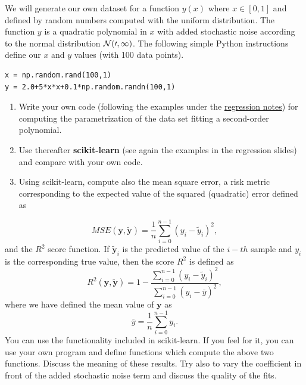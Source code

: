 \documentclass{beamer}
\newenvironment{doconceexercise}{}{}
\newcounter{doconceexercisecounter}
\newcounter{doconce:movie:counter}
\begin{document}
\begin{frame}
\begin{doconceexercise}
                             

We will generate our own dataset for a function $y(x)$ where $x \in [0,1]$ and defined by random numbers computed with the uniform distribution. The function $y$ is a quadratic polynomial in $x$ with added stochastic noise according to the normal distribution $\cal {N}(0,1)$.
The following simple Python instructions define our $x$ and $y$ values (with 100 data points).



\begin{verbatim}
x = np.random.rand(100,1)
y = 2.0+5*x*x+0.1*np.random.randn(100,1)

\end{verbatim}


\begin{enumerate}
\item Write your own code (following the examples under the \href{{https://compphysics.github.io/MachineLearning/doc/LectureNotes/_build/html/chapter1.html}}{regression notes}) for computing the parametrization of the data set fitting a second-order polynomial. 

\item Use thereafter \textbf{scikit-learn} (see again the examples in the regression slides) and compare with your own code.   

\item Using scikit-learn, compute also the mean square error, a risk metric corresponding to the expected value of the squared (quadratic) error defined as
\end{enumerate}

\noindent
\[ MSE(\bm{y},\bm{\tilde{y}}) = \frac{1}{n}
\sum_{i=0}^{n-1}(y_i-\tilde{y}_i)^2, 
\] 
and the $R^2$ score function.
If $\tilde{\bm{y}}_i$ is the predicted value of the $i-th$ sample and $y_i$ is the corresponding true value, then the score $R^2$ is defined as
\[
R^2(\bm{y}, \tilde{\bm{y}}) = 1 - \frac{\sum_{i=0}^{n - 1} (y_i - \tilde{y}_i)^2}{\sum_{i=0}^{n - 1} (y_i - \bar{y})^2},
\]
where we have defined the mean value  of $\bm{y}$ as
\[
\bar{y} =  \frac{1}{n} \sum_{i=0}^{n - 1} y_i.
\]
You can use the functionality included in scikit-learn. If you feel for it, you can use your own program and define functions which compute the above two functions. 
Discuss the meaning of these results. Try also to vary the coefficient in front of the added stochastic noise term and discuss the quality of the fits.


\end{doconceexercise}
\end{frame}
\end{document}
